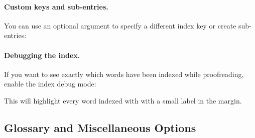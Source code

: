 \paragraph{Custom keys and sub-entries.} You can use an optional argument
to specify a different index key or create sub-entries:
\begin{latexcode}
\end{latexcode}

\paragraph{Debugging the index.} If you want to see exactly which words have
been indexed while proofreading, enable the index debug mode:
\begin{latexcode}
\end{latexcode}
This will highlight every word indexed with \latexinline{\ntindex} with a small
label in the margin.

\subsection{Glossary and Miscellaneous Options}
\label{sub:misc_options}

\begin{latexcode}







\end{latexcode}


